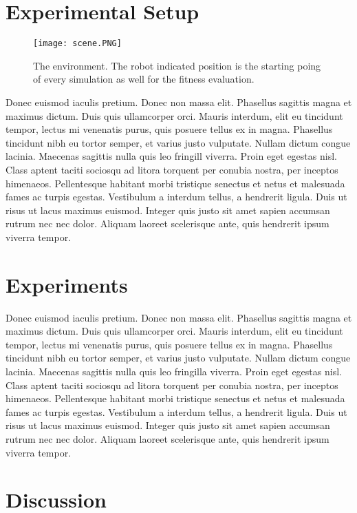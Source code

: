 \documentclass[format=acmsmall, review=false, screen=true]{acmart}
\begin{document}
\section{Experimental Setup}

\begin{figure}[H]
  \texttt{[image: scene.PNG]}
  \caption{The environment. The robot indicated position is the starting poing of every simulation as well for the fitness evaluation.}
  \label{fig:pioneer-robot}
\end{figure}

Donec euismod iaculis pretium. Donec non massa elit. Phasellus sagittis magna et maximus dictum. Duis quis ullamcorper orci. Mauris interdum, elit eu tincidunt tempor, lectus mi venenatis purus, quis posuere tellus ex in magna. Phasellus tincidunt nibh eu tortor semper, et varius justo vulputate. Nullam dictum congue lacinia. Maecenas sagittis nulla quis leo fringill viverra. Proin eget egestas nisl. Class aptent taciti sociosqu ad litora torquent per conubia nostra, per inceptos himenaeos. Pellentesque habitant morbi tristique senectus et netus et malesuada fames ac turpis egestas. Vestibulum a interdum tellus, a hendrerit ligula. Duis ut risus ut lacus maximus euismod. Integer quis justo sit amet sapien accumsan rutrum nec nec dolor. Aliquam laoreet scelerisque ante, quis hendrerit ipsum viverra tempor.

\section{Experiments}

Donec euismod iaculis pretium. Donec non massa elit. Phasellus sagittis magna et maximus dictum. Duis quis ullamcorper orci. Mauris interdum, elit eu tincidunt tempor, lectus mi venenatis purus, quis posuere tellus ex in magna. Phasellus tincidunt nibh eu tortor semper, et varius justo vulputate. Nullam dictum congue lacinia. Maecenas sagittis nulla quis leo fringilla viverra. Proin eget egestas nisl. Class aptent taciti sociosqu ad litora torquent per conubia nostra, per inceptos himenaeos. Pellentesque habitant morbi tristique senectus et netus et malesuada fames ac turpis egestas. Vestibulum a interdum tellus, a hendrerit ligula. Duis ut risus ut lacus maximus euismod. Integer quis justo sit amet sapien accumsan rutrum nec nec dolor. Aliquam laoreet scelerisque ante, quis hendrerit ipsum viverra tempor.

\section{Discussion}
\end{document}

